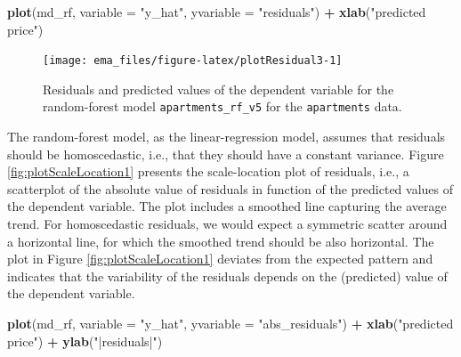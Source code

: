 \documentclass[]{krantz}
\newenvironment{Shaded}{\begin{snugshade}}{\end{snugshade}}
\newcommand{\DataTypeTok}[1]{\textcolor[rgb]{0.13,0.29,0.53}{#1}}
\newcommand{\KeywordTok}[1]{\textcolor[rgb]{0.13,0.29,0.53}{\textbf{#1}}}
\newcommand{\NormalTok}[1]{#1}
\newcommand{\OperatorTok}[1]{\textcolor[rgb]{0.81,0.36,0.00}{\textbf{#1}}}
\newcommand{\StringTok}[1]{\textcolor[rgb]{0.31,0.60,0.02}{#1}}
\begin{document}
\begin{Shaded}
\begin{Highlighting}[]
\KeywordTok{plot}\NormalTok{(md_rf, }\DataTypeTok{variable =} \StringTok{"y_hat"}\NormalTok{, }\DataTypeTok{yvariable =} \StringTok{"residuals"}\NormalTok{) }\OperatorTok{+}\StringTok{ }
\StringTok{    }\KeywordTok{xlab}\NormalTok{(}\StringTok{"predicted price"}\NormalTok{) }
\end{Highlighting}
\end{Shaded}

\begin{figure}

{\centering \texttt{[image: ema\_files/figure-latex/plotResidual3-1]} 

}

\caption{Residuals and predicted values of the dependent variable for the random-forest model \texttt{apartments\_rf\_v5} for the \texttt{apartments} data.}\label{fig:plotResidual3}
\end{figure}



The random-forest model, as the linear-regression model, assumes that residuals should be homoscedastic, i.e., that they should have a constant variance. Figure \ref{fig:plotScaleLocation1} presents the scale-location plot of residuals, i.e., a scatterplot of the absolute value of residuals in function of the predicted values of the dependent variable. The plot includes a smoothed line capturing the average trend. For homoscedastic residuals, we would expect a symmetric scatter around a horizontal line, for which the smoothed trend should be also horizontal. The plot in Figure \ref{fig:plotScaleLocation1} deviates from the expected pattern and indicates that the variability of the residuals depends on the (predicted) value of the dependent variable.



\begin{Shaded}
\begin{Highlighting}[]
\KeywordTok{plot}\NormalTok{(md_rf, }\DataTypeTok{variable =} \StringTok{"y_hat"}\NormalTok{, }\DataTypeTok{yvariable =} \StringTok{"abs_residuals"}\NormalTok{) }\OperatorTok{+}\StringTok{ }
\StringTok{    }\KeywordTok{xlab}\NormalTok{(}\StringTok{"predicted price"}\NormalTok{) }\OperatorTok{+}\StringTok{ }\KeywordTok{ylab}\NormalTok{(}\StringTok{"|residuals|"}\NormalTok{)}
\end{Highlighting}
\end{Shaded}
\end{document}

